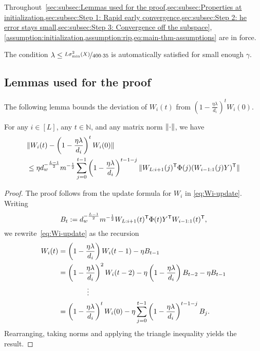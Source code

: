 \begin{remark}
    Throughout~\cref{sec:subsec:Lemmas used for the proof,sec:subsec:Properties at initialization,sec:subsec:Step 1: Rapid early convergence,sec:subsec:Step 2: he error stays small,sec:subsec:Step 3: Convergence off the subspace}, \cref{assumption:initialization,assumption:rip,eq:main-thm-assumptions} are in force.
\end{remark}
\begin{remark}
    The condition $\lambda \leq \nicefrac{L \sigma_{\min}^2(X)}{400 \cdot 35}$ is automatically satisfied for small enough $\gamma$.
\end{remark}

\subsection{Lemmas used for the proof}
\label{sec:subsec:Lemmas used for the proof}
The following lemma bounds the deviation of $W_{i}(t)$ from $\left(1-\frac{\eta \lambda}{d_i} \right)^t W_{i}(0)$.
\begin{lemma}
	\label{lemma:difference-norm}
  For any $i \in [L]$, any $t \in \mathbb{N}$, and any matrix norm $\lVert\cdot\rVert$, we have
	\begin{align*}
     & \lVert W_{i}(t)- \left(1-\frac{\eta \lambda}{d_i} \right)^t W_{i}(0)\rVert \\
		 & \leq
		\eta d_w^{-\frac{L-1}{2}}m^{-\frac{1}{2}} \sum_{j=0}^{t-1}
		\left(1 - \frac{\eta \lambda}{d_i}\right)^{t-1-j}
		\lVert W_{L:i+1}(j)^{\mathsf{T}} \Phi(j) (W_{i-1:1}(j) Y)^{\mathsf{T}}\rVert
		\label{eq:difference-norm-scaled}
	\end{align*}
\end{lemma}
\begin{proof}
	The proof follows from the update formula for $W_{i}$ in \cref{eq:Wi-update}.
	Writing
	\begin{equation}
		B_{t} := d_w^{-\frac{L-1}{2}}m^{-\frac{1}{2}} W_{L:i+1}(t)^{\mathsf{T}} \Phi(t) Y^{\mathsf{T}} W_{i-1:1}(t)^{\mathsf{T}},
	\end{equation}
	we rewrite~\cref{eq:Wi-update} as the recursion
	\begin{align*}
		W_i(t) & = \left(1 - \frac{\eta \lambda}{d_i}\right) W_i(t-1) - \eta B_{t-1} \notag \\
		       & = \left(1 - \frac{\eta \lambda}{d_i}\right)^2 W_i(t-2)
		- \eta \left(1 - \frac{\eta \lambda}{d_i}\right) B_{t-2} - \eta B_{t-1} \notag      \\
		       & \qquad \qquad \vdots \notag                                                \\
		       & = \left(1 - \frac{\eta \lambda}{d_i}\right)^t W_i(0)
		- \eta \sum_{j=0}^{t-1} \left(1 - \frac{\eta \lambda}{d_i}\right)^{t-1-j} B_{j}.
	\end{align*}
	Rearranging, taking norms and applying the triangle inequality yields the result.
\end{proof}
